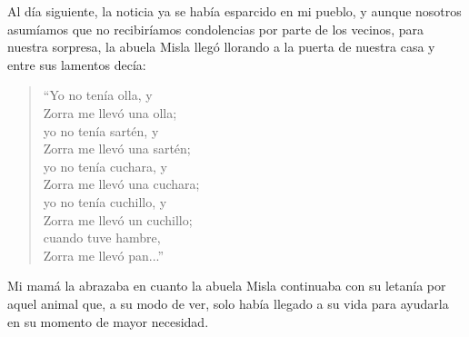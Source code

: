 Al día siguiente, la noticia ya se había esparcido en mi pueblo, y aunque nosotros asumíamos que no recibiríamos condolencias por parte de los vecinos, para nuestra sorpresa, la abuela Misla llegó llorando a la puerta de nuestra casa y entre sus lamentos decía:
\begin{quotation}
\noindent ``Yo no tenía olla, y \\Zorra me llevó una olla;\\ 
yo no tenía sartén, y \\Zorra me llevó una sartén;\\ 
yo no tenía cuchara, y \\Zorra me llevó una cuchara;\\
yo no tenía cuchillo, y \\Zorra me llevó un cuchillo;\\
cuando tuve hambre, \\Zorra me llevó pan...''
\end{quotation}
Mi mamá la abrazaba en cuanto la abuela Misla continuaba con su letanía por aquel animal que, a su modo de ver, solo había llegado a su vida para ayudarla en su momento de mayor necesidad.

